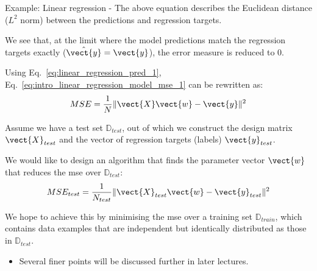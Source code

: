\begin{frame}[t,allowframebreaks]{
    Example: Linear regression - }
    The above equation
    describes the Euclidean distance ($L^2$ norm) 
    between the predictions and regression targets.\\

    \vspace{0.2cm}

    We see that, at the limit where the model predictions 
    match the regression targets exactly 
    ($\hat{\vect{y}}=\vect{y}$), 
    the error measure is reduced to 0.\\

    \vspace{0.2cm}

    Using Eq.~\ref{eq:linear_regression_pred_1}, 
    Eq.~\ref{eq:intro_linear_regression_model_mse_1}
    can be rewritten as:\\
    \begin{equation}
        MSE = 
           \frac{1}{N} 
            \lVert \vect{X} \vect{w} - \vect{y} \rVert^2 
        \label{eq:intro_linear_regression_model_mse_2}
    \end{equation}

    \framebreak


    Assume we have a \gls{test set} 
    $\mathbb{D}_{test}$,
    out of which we construct the
    \gls{design matrix} $\vect{X}_{test}$
    and the vector of regression targets (labels) $\vect{y}_{test}$.\\
    \vspace{0.1cm}

    We would like to design an algorithm that finds the parameter 
    vector $\vect{w}$ that reduces the 
    \gls{mse} over $\mathbb{D}_{test}$:\\
    \vspace{-0.1cm}
    \begin{equation}
        MSE_{test} = 
           \frac{1}{N_{test}} 
            \lVert \vect{X}_{test} \vect{w} - \vect{y}_{test} \rVert^2
        \label{eq:intro_linear_regression_model_mse_test}
    \end{equation}

    We hope to achieve this 
    by minimising the \gls{mse} over a 
    \gls{training set} $\mathbb{D}_{train}$,
    which contains data examples that are 
    independent but identically distributed
    as those in $\mathbb{D}_{test}$.\\
    \begin{itemize}
      \small
      \item Several finer points will be discussed further in later lectures.\\
    \end{itemize}


\end{frame}
